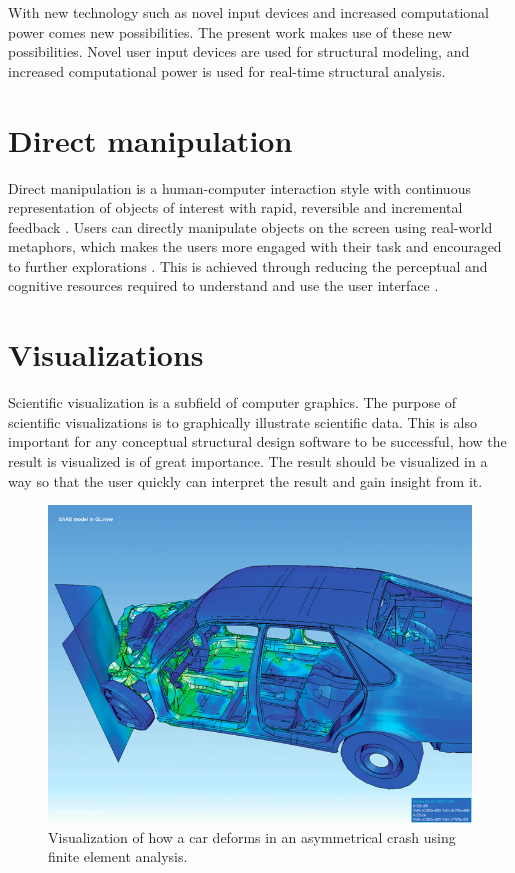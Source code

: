 With new technology such as novel input devices and increased computational power comes new possibilities. The present work makes use of these new possibilities. Novel user input devices are used for structural modeling, and increased computational power is used for real-time structural analysis. 

\section{Direct manipulation}
Direct manipulation is a human-computer interaction style with continuous representation of objects of interest with rapid, reversible and incremental feedback \cite{Shneiderman1982}. Users can directly manipulate objects on the screen using real-world metaphors, which makes the users more engaged with their task and encouraged to further explorations \cite{Shneiderman:1997:DMC:238218.238281}. This is achieved through reducing the perceptual and cognitive resources required to understand and use the user interface \cite{Sears1990}.

\section{Visualizations}
Scientific visualization is a subfield of computer graphics. The purpose of scientific visualizations is to graphically illustrate scientific data. This is also important for any conceptual structural design software to be successful, how the result is visualized is of great importance. The result should be visualized in a way so that the user quickly can interpret the result and gain insight from it. 

\begin{figure}
  \includegraphics[width=350pt]{graphics/car.jpg}
  \caption{Visualization of how a car deforms in an asymmetrical crash using finite element analysis.}
  \label{fig:Car}
\end{figure}

